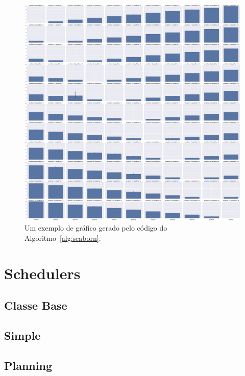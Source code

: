\begin{figure}[htb]
  \centering
  \includegraphics[scale=0.1]{img/seaborn_example.eps}
  \caption{Um exemplo de gráfico gerado pelo código do
    Algoritmo~\ref{alg:seaborn}.}
  \label{fig:seaborn:exemplo}
\end{figure}

\section{Schedulers}

\lipsum[1]

\subsection{Classe Base}

\lipsum[1]

\subsection{Simple}

\lipsum[1]

\subsection{Planning}

